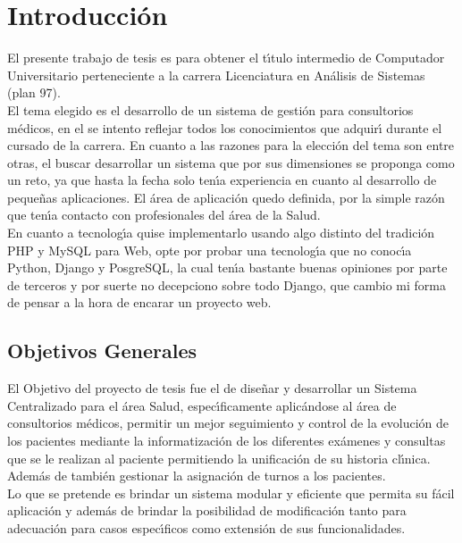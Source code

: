 \chapter{Introducci\'on}

El presente trabajo de tesis es para obtener el t\'{\i}tulo intermedio de Computador Universitario perteneciente a la carrera Licenciatura en An\'alisis de Sistemas (plan 97).\\[0.1cm]
El tema elegido es el desarrollo de un sistema de gesti\'on para consultorios m\'edicos, en el se intento reflejar todos los conocimientos que adquir\'{\i} durante el cursado de la carrera. En cuanto a las razones para la elecci\'on del tema son entre otras, el buscar desarrollar un sistema que por sus dimensiones se proponga como un reto, ya que hasta la fecha solo ten\'{\i}a experiencia en cuanto al desarrollo de peque\~nas aplicaciones. El \'area de aplicaci\'on quedo definida, por la simple raz\'on que ten\'{\i}a contacto con profesionales del \'area de la Salud.\\[0.1cm]

En cuanto a tecnolog\'{\i}a quise implementarlo usando algo distinto del tradici\'on PHP y MySQL para Web, opte por probar una tecnolog\'{\i}a que no conoc\'{\i}a Python, Django y PosgreSQL, la cual ten\'{\i}a bastante buenas opiniones por parte de terceros y por suerte no decepciono sobre todo Django, que cambio mi forma de pensar a la hora de encarar un proyecto web.\\[0.1cm]


\section{Objetivos Generales}
El Objetivo del proyecto de tesis fue el de dise\~nar y desarrollar un Sistema Centralizado para el \'area Salud, espec\'{\i}ficamente aplic\'andose al \'area de consultorios m\'edicos, permitir un mejor seguimiento y control de la evoluci\'on de los pacientes mediante la informatizaci\'on de los diferentes ex\'amenes y consultas que se le realizan al paciente permitiendo la unificaci\'on de su historia cl\'{\i}nica. Adem\'as de tambi\'en gestionar la asignaci\'on de turnos a los pacientes.\\[0.1cm]

Lo que se pretende es brindar un sistema modular y eficiente que permita su f\'acil aplicaci\'on y adem\'as de brindar la posibilidad de modificaci\'on tanto para adecuaci\'on para casos espec\'{\i}ficos como extensi\'on de sus funcionalidades.\\[0.1cm]


